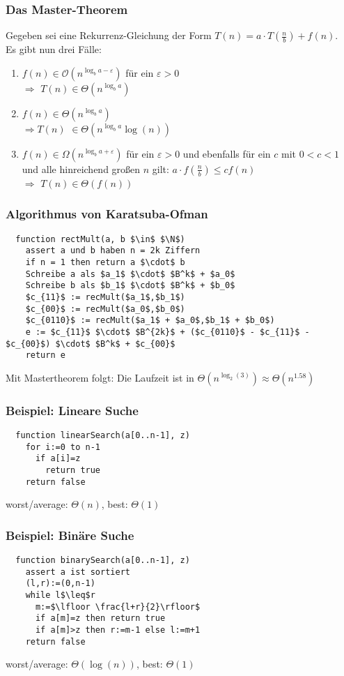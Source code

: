 \begin{frame}
\frametitle{Das Master-Theorem}
Gegeben sei eine Rekurrenz-Gleichung der Form $T(n) = a \cdot T(\frac{n}{b}) + f(n)$.\\
Es gibt nun drei Fälle:
\begin{enumerate}
\item $f(n) \in \mathcal{O}\left( n^{\log_b a - \varepsilon} \right)$ 
für ein $\varepsilon>0$\\ $\Rightarrow$ $T(n) \in \Theta\left( n^{\log_b a} \right)$ \pause
\item $f(n) \in \Theta\left( n^{\log_b a} \right)$\\ $\Rightarrow T(n)$ $\in \Theta\left( n^{\log_b a} \log(n)\right)$ \pause
\item $f(n) \in \Omega\left( n^{\log_b a + \varepsilon} \right)$ für ein $\varepsilon>0$
und ebenfalls für ein $c$ mit $0 < c < 1$ und alle hinreichend großen $n$ gilt:
$a \cdot f( \textstyle \frac{n}{b} ) \leq c f(n)$\\ $\Rightarrow$ $T(n) \in \Theta(f(n))$
\end{enumerate}
\end{frame}

\begin{frame}[fragile]
\frametitle{Algorithmus von Karatsuba-Ofman}
\begin{lstlisting}
  function rectMult(a, b $\in$ $\N$)
    assert a und b haben n = 2k Ziffern
    if n = 1 then return a $\cdot$ b
    Schreibe a als $a_1$ $\cdot$ $B^k$ + $a_0$
    Schreibe b als $b_1$ $\cdot$ $B^k$ + $b_0$
    $c_{11}$ := recMult($a_1$,$b_1$)
    $c_{00}$ := recMult($a_0$,$b_0$)
    $c_{0110}$ := recMult($a_1$ + $a_0$,$b_1$ + $b_0$)
    e := $c_{11}$ $\cdot$ $B^{2k}$ + ($c_{0110}$ - $c_{11}$ - $c_{00}$) $\cdot$ $B^k$ + $c_{00}$
    return e
\end{lstlisting}\pause
Mit Mastertheorem folgt: Die Laufzeit ist in $\Theta(n^{\log_2(3)})\approx\Theta(n^{1.58})$
\end{frame}

\begin{frame}[fragile]
\frametitle{Beispiel: Lineare Suche}
\begin{lstlisting}
  function linearSearch(a[0..n-1], z)
    for i:=0 to n-1
      if a[i]=z
      	return true
    return false
\end{lstlisting}\pause
worst/average: $\Theta(n)$, best: $\Theta(1)$
\end{frame}

\begin{frame}[fragile]
\frametitle{Beispiel: Binäre Suche}
\begin{lstlisting}
  function binarySearch(a[0..n-1], z)
    assert a ist sortiert
    (l,r):=(0,n-1)
    while l$\leq$r
      m:=$\lfloor \frac{l+r}{2}\rfloor$
      if a[m]=z then return true
      if a[m]>z then r:=m-1 else l:=m+1
    return false
\end{lstlisting}\pause
worst/average: $\Theta(\log(n))$, best: $\Theta(1)$
\end{frame}

